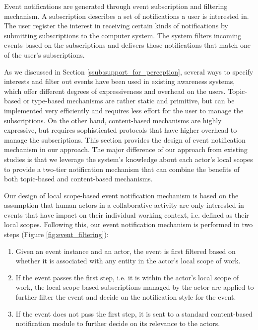 Event notifications are generated through event subscription and filtering mechanism. A subscription describes a set of notifications a user is interested in. The user register the interest in receiving certain kinds of notifications by submitting subscriptions to the computer system. The system filters incoming events based on the subscriptions and delivers those notifications that match one of the user’s subscriptions. 

As we discussed in Section \ref{ssub:support_for_perception}, several ways to specify interests and filter out events have been used in existing awareness systems, which offer different degrees of expressiveness and overhead on the users. Topic-based or type-based mechanisms are rather static and primitive, but can be implemented very efficiently and requires less effort for the user to manage the subscriptions. On the other hand, content-based mechanisms are highly expressive, but requires sophisticated protocols that have higher overhead to manage the subscriptions. This section provides the design of event notification mechanism in our approach. The major difference of our approach from existing studies is that we leverage the system's knowledge about each actor's local scopes to provide a two-tier notification mechanism that can combine the benefits of both topic-based and content-based mechanisms. 

Our design of local scope-based event notification mechanism is based on the assumption that human actors in a collaborative activity are only interested in events that have impact on their individual working context, i.e. defined as their local scopes. Following this, our event notification mechanism is performed in two steps (Figure \ref{fig:event_filtering}):
\begin{enumerate}
  	\item Given an event instance and an actor, the event is first filtered based on whether it is associated with any entity in the actor's local scope of work. 
  	\item If the event passes the first step, i.e. it is within the actor's local scope of work, the local scope-based subscriptions managed by the actor are applied to further filter the event and decide on the notification style for the event.
  	\item If the event does not pass the first step, it is sent to a standard content-based notification module to further decide on its relevance to the actors.
\end{enumerate}  

